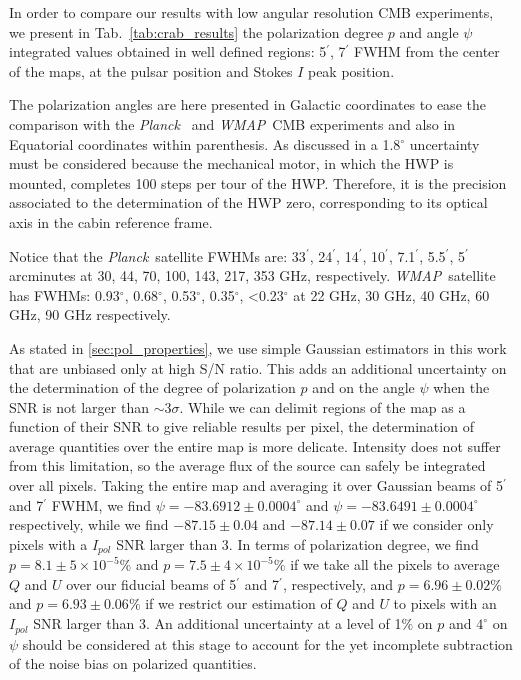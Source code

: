\documentclass[twocolumn,traditabstract]{aa}
\def\Planck{\textit{Planck}}
\def\WMAP{\textit{WMAP}}
\begin{document}
In order to compare our results with low angular resolution CMB experiments, we present in Tab.~\ref{tab:crab_results} the
polarization degree $p$ and angle $\psi$ integrated values obtained in well
defined regions: 5$^\prime$, 7$^\prime$ FWHM from the center of the maps, at the pulsar position and Stokes $I$ peak position.


The polarization angles are here presented in Galactic coordinates to ease the comparison with the \Planck\ \citep{2015arXiv150702058P} and \WMAP\ CMB experiments \citep{2011ApJS..192...19W} and also in Equatorial coordinates within parenthesis.
As discussed in \cite{ritacco2017} a 1.8$^{\circ}$ uncertainty must be considered because the mechanical motor, in which the HWP is mounted, completes 100 steps per tour of the HWP. Therefore, it is the precision associated to the determination of the HWP zero, corresponding to its optical axis in the cabin reference frame.

Notice that the \Planck\ satellite FWHMs are: 33$^{\prime}$, 24$^{\prime}$, 14$^{\prime}$, 10$^{\prime}$, 7.1$^{\prime}$, 5.5$^{\prime}$, 5$^{\prime}$ arcminutes at 30, 44, 70, 100, 143, 217, 353 GHz, respectively.
\WMAP\ satellite has FWHMs: 0.93$^{\circ}$, 0.68$^{\circ}$, 0.53$^{\circ}$, 0.35$^{\circ}$, \textless 0.23$^{\circ}$ at 22 GHz, 30 GHz, 40 GHz, 60 GHz, 90 GHz respectively. 

As stated in \ref{sec:pol_properties}, we use simple Gaussian
  estimators in this work that are unbiased only at high S/N ratio. This adds an
  additional uncertainty on the determination of the degree of polarization $p$
  and on the angle $\psi$ when the SNR is not larger than $\sim 3\sigma$. While
  we can delimit regions of the map as a function of their SNR to give reliable
  results per pixel, the determination of average quantities over the entire map
  is more delicate. Intensity does not suffer from this limitation, so the
  average flux of the source can safely be integrated over all pixels. Taking
  the entire map and averaging it over Gaussian beams of 5$^{\prime}$ and
  7$^{\prime}$ FWHM, we find $\psi = -83.6912 \pm 0.0004^{\circ}$ and $\psi =
  -83.6491 \pm 0.0004^{\circ}$ respectively, while we find $-87.15 \pm 0.04$ and
  $-87.14 \pm 0.07$ if we consider only pixels with a $I_{pol}$ SNR larger than
  3. In terms of polarization degree, we find $p = 8.1 \pm 5\times 10^{-5}\%$
  and $p = 7.5 \pm 4\times 10^{-5}\%$ if we take all the pixels to average $Q$
  and $U$ over our fiducial beams of 5$^{\prime}$ and 7$^{\prime}$,
  respectively, and $p = 6.96 \pm 0.02\%$ and $p = 6.93 \pm 0.06\%$ if we
  restrict our estimation of $Q$ and $U$ to pixels with an $I_{pol}$ SNR larger
  than 3.  An additional uncertainty at a level of 1$\%$ on
  $p$ and $4^{\circ}$ on $\psi$ should be considered at this stage to account
  for the yet incomplete subtraction of the noise bias on polarized quantities.
\end{document}
